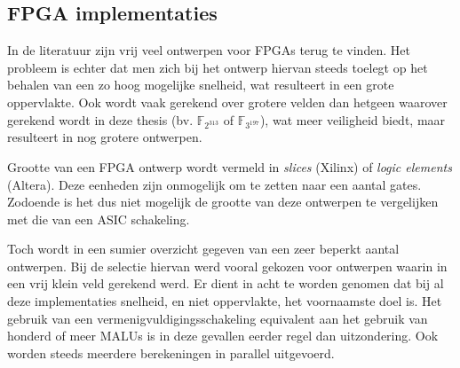 \subsection{FPGA implementaties}

In de literatuur zijn vrij veel ontwerpen voor FPGAs terug te vinden. Het probleem is echter dat men zich bij het ontwerp hiervan steeds toelegt op het behalen van een zo hoog mogelijke snelheid, wat resulteert in een grote oppervlakte. Ook wordt vaak gerekend over grotere velden dan hetgeen waarover gerekend wordt in deze thesis (bv. $\mathbb{F}_{2^{313}}$ of $\mathbb{F}_{3^{197}}$), wat meer veiligheid biedt, maar resulteert in nog grotere ontwerpen.

Grootte van een FPGA ontwerp wordt vermeld in \emph{slices} (Xilinx) of \emph{logic elements} (Altera). Deze eenheden zijn onmogelijk om te zetten naar een aantal gates. Zodoende is het dus niet mogelijk de grootte van deze ontwerpen te vergelijken met die van een ASIC schakeling.

Toch wordt in  een sumier overzicht gegeven van een zeer beperkt aantal ontwerpen. Bij de selectie hiervan werd vooral gekozen voor ontwerpen waarin in een vrij klein veld gerekend werd. Er dient in acht te worden genomen dat bij al deze implementaties snelheid, en niet oppervlakte, het voornaamste doel is. Het gebruik van een vermenigvuldigingsschakeling equivalent aan het gebruik van honderd of meer MALUs is in deze gevallen eerder regel dan uitzondering. Ook worden steeds meerdere berekeningen in parallel uitgevoerd.

